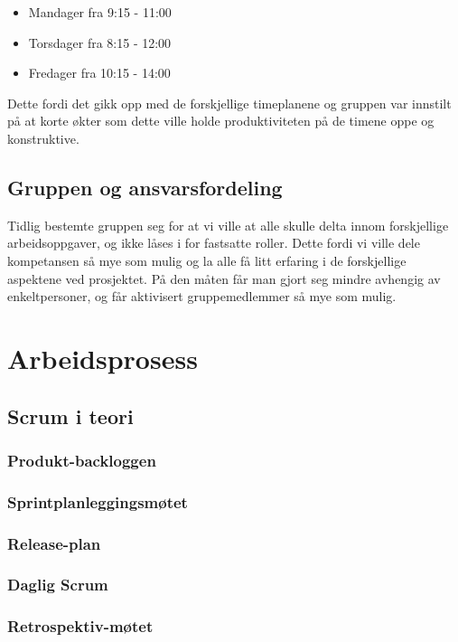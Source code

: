 \documentclass[12pt,a4paper,norsk]{article}
\begin{document}
\begin{itemize}
  \item[] Mandager fra 9:15 - 11:00 
  \item[] Torsdager fra 8:15 - 12:00
  \item[] Fredager fra 10:15 - 14:00
\end{itemize}

Dette fordi det gikk opp med de forskjellige timeplanene og gruppen var innstilt på at korte økter som dette ville holde produktiviteten på de timene oppe og konstruktive. 

\subsection{Gruppen og ansvarsfordeling}

Tidlig bestemte gruppen seg for at vi ville at alle skulle delta innom forskjellige arbeidsoppgaver, og ikke låses i for fastsatte roller. Dette fordi vi ville dele kompetansen så mye som mulig og la alle få litt erfaring i de forskjellige aspektene ved prosjektet. På den måten får man gjort seg mindre avhengig av enkeltpersoner, og får aktivisert gruppemedlemmer så mye som mulig. 

	\section{Arbeidsprosess}
	\subsection{Scrum i teori}
	\subsubsection{Produkt-backloggen}
	\subsubsection{Sprintplanleggingsmøtet}
	\subsubsection{Release-plan}
	\subsubsection{Daglig Scrum}
	\subsubsection{Retrospektiv-møtet}
\end{document}
